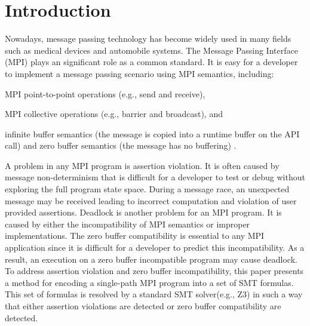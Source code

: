 \section{Introduction}
Nowadays, message passing technology has become widely used in many fields such as medical devices and automobile systems. The Message Passing Interface (MPI) plays an significant role as a common standard. It is easy for a developer to implement a message passing scenario using MPI semantics, including:

\begin{compactitem}
\item MPI point-to-point operations (e.g., send and receive),
\item MPI collective operations (e.g., barrier and broadcast), and
\item infinite buffer semantics (the message is copied into a runtime buffer on the API call) and zero buffer semantics (the message has no buffering) \cite{DBLP:conf/fm/VakkalankaVGK09}.
\end{compactitem}

A problem in any MPI program is assertion violation. It is often caused by message non-determinism that is difficult for a developer to test or debug without exploring the full program state space. During a message race, an unexpected message may be received leading to incorrect computation and violation of user provided assertions. Deadlock is another problem for an MPI program. It is caused by either the incompatibility of MPI semantics or improper implementations. The zero buffer compatibility is essential to any MPI application since it is difficult for a developer to predict this incompatibility. As a result, an execution on a zero buffer incompatible program may cause deadlock. To address assertion violation and zero buffer incompatibility, this paper presents a method for encoding a single-path MPI program into a set of SMT formulas. This set of formulas is resolved by a standard SMT solver(e.g., Z3) in such a way that either assertion violations are detected or zero buffer compatibility are detected. 


